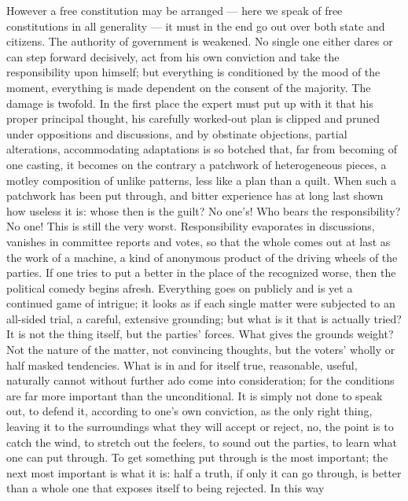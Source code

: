 \documentclass[12pt,a4paper,openany]{book}
\newcommand{\opage}[1]{\marginnote{\footnotesize\textit{[#1]}}}
\begin{document}
However a free constitution may be arranged --- here we speak
of free constitutions in all generality --- it must in the end
go out over both state and citizens. The authority of government
is weakened. No single one either dares or can
step forward decisively, act from his own conviction and
take the responsibility upon himself; but everything is conditioned by the
\setcounter{footnote}{0}%
\opage{9}mood of the moment, everything is made dependent on the consent of the majority.
The damage is twofold. In the first place the expert must
put up with it that his proper principal thought, his carefully
worked-out plan is clipped and pruned under oppositions and discussions,
and by obstinate objections,
partial alterations, accommodating adaptations
is so botched that, far from becoming of one casting,
it becomes on the contrary a patchwork of heterogeneous pieces,
a motley composition of unlike patterns, less
like a plan than a quilt. When such a patchwork
has been put through, and bitter experience has at long last
shown how useless it is: whose then is the
guilt? No one's! Who bears the responsibility? No one! This
is still the very worst. Responsibility evaporates in
discussions, vanishes in committee reports and votes,
so that the whole comes out at last as
the work of a machine, a kind of anonymous product of the
driving wheels of the parties. If one tries to put a better in
the place of the recognized worse, then the
political comedy begins afresh. Everything goes on publicly and is
yet a continued game of intrigue; it looks as if each
single matter were subjected to an all-sided trial, a careful, extensive
grounding; but what is it that
is actually tried? It is not the thing itself, but the parties'
forces. What gives the grounds weight? Not the nature
of the matter, not convincing thoughts, but the voters'
wholly or half masked tendencies. What is in and
for itself true, reasonable, useful, naturally cannot
without further ado come into consideration; for the conditions are
far more important than the unconditional. It is simply not
done to speak out, to defend it, according to one's
\setcounter{footnote}{0}%
\opage{10}own conviction, as the only right thing, leaving it to the surroundings
what they will accept or reject, no, the point
is to catch the wind, to stretch out the feelers, to sound out
the parties, to learn what one can put through. To get something put through is the most important; the
next most important is what it is: half a truth,
if only it can go through, is better than a whole one
that exposes itself to being rejected. In this way
\end{document}
